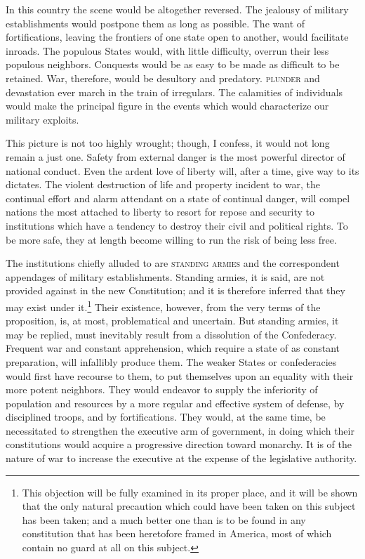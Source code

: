 In this country the scene would be altogether reversed. The jealousy of military establishments would postpone them as long as possible. The want of fortifications, leaving the frontiers of one state open to another, would facilitate inroads. The populous States would, with little difficulty, overrun their less populous neighbors. Conquests would be as easy to be made as difficult to be retained. War, therefore, would be desultory and predatory. \textsc{plunder }and devastation ever march in the train of irregulars. The calamities of individuals would make the principal figure in the events which would characterize our military exploits.

This picture is not too highly wrought; though, I confess, it would not long remain a just one. Safety from external danger is the most powerful director of national conduct. Even the ardent love of liberty will, after a time, give way to its dictates. The violent destruction of life and property incident to war, the continual effort and alarm attendant on a state of continual danger, will compel nations the most attached to liberty to resort for repose and security to institutions which have a tendency to destroy their civil and political rights. To be more safe, they at length become willing to run the risk of being less free.

The institutions chiefly alluded to are \textsc{standing armies }and the correspondent appendages of military establishments. Standing armies, it is said, are not provided against in the new Constitution; and it is therefore inferred that they may exist under it.\footnote{This objection will be fully examined in its proper place, and it will be shown that the only natural precaution which could have been taken on this subject has been taken; and a much better one than is to be found in any constitution that has been heretofore framed in America, most of which contain no guard at all on this subject.} Their existence, however, from the very terms of the proposition, is, at most, problematical and uncertain. But standing armies, it may be replied, must inevitably result from a dissolution of the Confederacy. Frequent war and constant apprehension, which require a state of as constant preparation, will infallibly produce them. The weaker States or confederacies would first have recourse to them, to put themselves upon an equality with their more potent neighbors. They would endeavor to supply the inferiority of population and resources by a more regular and effective system of defense, by disciplined troops, and by fortifications. They would, at the same time, be necessitated to strengthen the executive arm of government, in doing which their constitutions would acquire a progressive direction toward monarchy. It is of the nature of war to increase the executive at the expense of the legislative authority.

